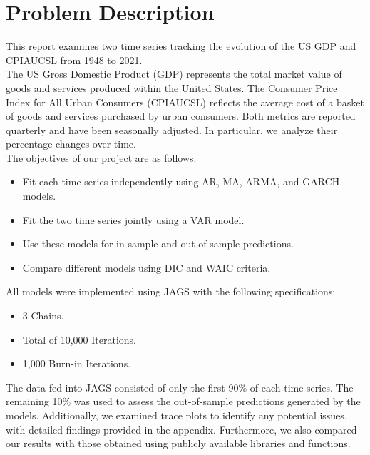 \section{Problem Description}
This report examines two time series tracking the evolution of the US GDP and CPIAUCSL from 1948 to 2021. \\
The US Gross Domestic Product (GDP) represents the total market value of goods and services produced within the United States. The Consumer Price Index for All Urban Consumers (CPIAUCSL) reflects the average cost of a basket of goods and services purchased by urban consumers. Both metrics are reported quarterly and have been seasonally adjusted. In particular, we analyze their percentage changes over time. \\
The objectives of our project are as follows:
\begin{itemize}
    \item Fit each time series independently using AR, MA, ARMA, and GARCH models.
    \item Fit the two time series jointly using a VAR model.
    \item Use these models for in-sample and out-of-sample predictions.
    \item Compare different models using DIC and WAIC criteria.
\end{itemize}
All models were implemented using JAGS with the following specifications:
\begin{itemize}
    \item 3 Chains.
    \item Total of 10,000 Iterations.
    \item 1,000 Burn-in Iterations.
\end{itemize}
The data fed into JAGS consisted of only the first 90\% of each time series. The remaining 10\% was used to assess the out-of-sample predictions generated by the models.
Additionally, we examined trace plots to identify any potential issues, with detailed findings provided in the appendix. Furthermore, we also compared our results with those obtained using publicly available libraries and functions. \\